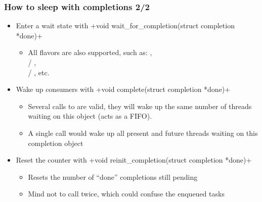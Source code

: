 \begin{frame}[fragile]
  \newcommand\kfuncbis[2]{\href{https://elixir.bootlin.com/linux/latest/ident/#1}{\codelink{#2()}}}
  \frametitle{How to sleep with completions 2/2}
  \begin{itemize}
  \item Enter a wait state with +void wait_for_completion(struct completion *done)+
    \begin{itemize}
    \item All  flavors are also supported, such as:
      , \\
       /
      \kfuncbis{wait_for_completion_interruptible_timeout}{_timeout}, \\
       /
      \kfuncbis{wait_for_completion_killable_timeout}{_timeout}, etc.
    \end {itemize}
  \item Wake up consumers with
    +void complete(struct completion *done)+
    \begin{itemize}
    \item Several calls to  are valid, they will wake up
      the same number of threads waiting on this object (acts as a FIFO).
    \item A single  call would wake up all present and
      future threads waiting on this completion object
    \end {itemize}
  \item Reset the counter with
    +void reinit_completion(struct completion *done)+
    \begin{itemize}
    \item Resets the number of ``done'' completions still pending
    \item Mind not to call  twice, which could
      confuse the enqueued tasks
    \end{itemize}
  \end{itemize}
\end{frame}

